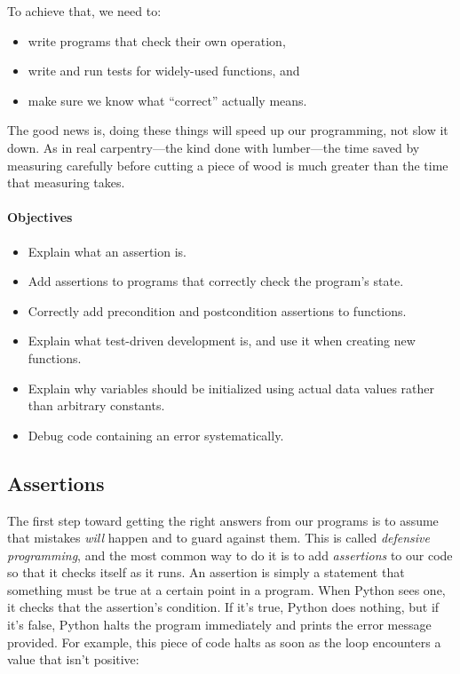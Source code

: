 \documentclass[]{book}
\newcommand{\gdef}[2]{\emph{#2}}
\begin{document}
To achieve that, we need to:

\begin{itemize}
\item
  write programs that check their own operation,
\item
  write and run tests for widely-used functions, and
\item
  make sure we know what ``correct'' actually means.
\end{itemize}

The good news is, doing these things will speed up our programming, not
slow it down. As in real carpentry---the kind done with lumber---the
time saved by measuring carefully before cutting a piece of wood is much
greater than the time that measuring takes.

\mbox{}\paragraph{Objectives}

\begin{itemize}
\item
  Explain what an assertion is.
\item
  Add assertions to programs that correctly check the program's state.
\item
  Correctly add precondition and postcondition assertions to functions.
\item
  Explain what test-driven development is, and use it when creating new
  functions.
\item
  Explain why variables should be initialized using actual data values
  rather than arbitrary constants.
\item
  Debug code containing an error systematically.
\end{itemize}

\subsection{Assertions}

The first step toward getting the right answers from our programs is to
assume that mistakes \emph{will} happen and to guard against them. This
is called \gdef{g:defensive-programming}{defensive programming}, and
the most common way to do it is to add
\gdef{g:assertion}{assertions} to our code so that it checks itself
as it runs. An assertion is simply a statement that something must be
true at a certain point in a program. When Python sees one, it checks
that the assertion's condition. If it's true, Python does nothing, but
if it's false, Python halts the program immediately and prints the error
message provided. For example, this piece of code halts as soon as the
loop encounters a value that isn't positive:
\end{document}
